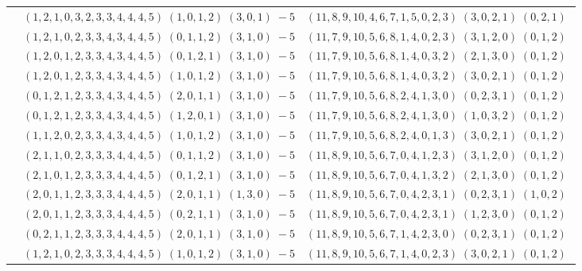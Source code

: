 \documentclass[11pt]{article}
\begin{document}
\begin{longtable}[l]{|c|c|c|}
 \cline{2-3} 
 & $(1 ,2 ,1 ,0 ,3 ,2 ,3 ,3 ,4 ,4 ,4 ,5) \;(1 ,0 ,1 ,2) \;(3 ,0 ,1) \;-5$ & $(11 ,8 ,9 ,10 ,4 ,6 ,7 ,1 ,5 ,0 ,2 ,3) \;(3 ,0 ,2 ,1) \;(0 ,2 ,1) \;$\\ 
 \cline{2-3} 
 & $(1 ,2 ,1 ,0 ,2 ,3 ,3 ,4 ,3 ,4 ,4 ,5) \;(0 ,1 ,1 ,2) \;(3 ,1 ,0) \;-5$ & $(11 ,7 ,9 ,10 ,5 ,6 ,8 ,1 ,4 ,0 ,2 ,3) \;(3 ,1 ,2 ,0) \;(0 ,1 ,2) \;$\\ 
 \cline{2-3} 
 & $(1 ,2 ,0 ,1 ,2 ,3 ,3 ,4 ,3 ,4 ,4 ,5) \;(0 ,1 ,2 ,1) \;(3 ,1 ,0) \;-5$ & $(11 ,7 ,9 ,10 ,5 ,6 ,8 ,1 ,4 ,0 ,3 ,2) \;(2 ,1 ,3 ,0) \;(0 ,1 ,2) \;$\\ 
 \cline{2-3} 
 & $(1 ,2 ,0 ,1 ,2 ,3 ,3 ,4 ,3 ,4 ,4 ,5) \;(1 ,0 ,1 ,2) \;(3 ,1 ,0) \;-5$ & $(11 ,7 ,9 ,10 ,5 ,6 ,8 ,1 ,4 ,0 ,3 ,2) \;(3 ,0 ,2 ,1) \;(0 ,1 ,2) \;$\\ 
 \cline{2-3} 
 & $(0 ,1 ,2 ,1 ,2 ,3 ,3 ,4 ,3 ,4 ,4 ,5) \;(2 ,0 ,1 ,1) \;(3 ,1 ,0) \;-5$ & $(11 ,7 ,9 ,10 ,5 ,6 ,8 ,2 ,4 ,1 ,3 ,0) \;(0 ,2 ,3 ,1) \;(0 ,1 ,2) \;$\\ 
 \cline{2-3} 
 & $(0 ,1 ,2 ,1 ,2 ,3 ,3 ,4 ,3 ,4 ,4 ,5) \;(1 ,2 ,0 ,1) \;(3 ,1 ,0) \;-5$ & $(11 ,7 ,9 ,10 ,5 ,6 ,8 ,2 ,4 ,1 ,3 ,0) \;(1 ,0 ,3 ,2) \;(0 ,1 ,2) \;$\\ 
 \cline{2-3} 
 & $(1 ,1 ,2 ,0 ,2 ,3 ,3 ,4 ,3 ,4 ,4 ,5) \;(1 ,0 ,1 ,2) \;(3 ,1 ,0) \;-5$ & $(11 ,7 ,9 ,10 ,5 ,6 ,8 ,2 ,4 ,0 ,1 ,3) \;(3 ,0 ,2 ,1) \;(0 ,1 ,2) \;$\\ 
 \cline{2-3} 
 & $(2 ,1 ,1 ,0 ,2 ,3 ,3 ,3 ,4 ,4 ,4 ,5) \;(0 ,1 ,1 ,2) \;(3 ,1 ,0) \;-5$ & $(11 ,8 ,9 ,10 ,5 ,6 ,7 ,0 ,4 ,1 ,2 ,3) \;(3 ,1 ,2 ,0) \;(0 ,1 ,2) \;$\\ 
 \cline{2-3} 
 & $(2 ,1 ,0 ,1 ,2 ,3 ,3 ,3 ,4 ,4 ,4 ,5) \;(0 ,1 ,2 ,1) \;(3 ,1 ,0) \;-5$ & $(11 ,8 ,9 ,10 ,5 ,6 ,7 ,0 ,4 ,1 ,3 ,2) \;(2 ,1 ,3 ,0) \;(0 ,1 ,2) \;$\\ 
 \cline{2-3} 
 & $(2 ,0 ,1 ,1 ,2 ,3 ,3 ,3 ,4 ,4 ,4 ,5) \;(2 ,0 ,1 ,1) \;(1 ,3 ,0) \;-5$ & $(11 ,8 ,9 ,10 ,5 ,6 ,7 ,0 ,4 ,2 ,3 ,1) \;(0 ,2 ,3 ,1) \;(1 ,0 ,2) \;$\\ 
 \cline{2-3} 
 & $(2 ,0 ,1 ,1 ,2 ,3 ,3 ,3 ,4 ,4 ,4 ,5) \;(0 ,2 ,1 ,1) \;(3 ,1 ,0) \;-5$ & $(11 ,8 ,9 ,10 ,5 ,6 ,7 ,0 ,4 ,2 ,3 ,1) \;(1 ,2 ,3 ,0) \;(0 ,1 ,2) \;$\\ 
 \cline{2-3} 
 & $(0 ,2 ,1 ,1 ,2 ,3 ,3 ,3 ,4 ,4 ,4 ,5) \;(2 ,0 ,1 ,1) \;(3 ,1 ,0) \;-5$ & $(11 ,8 ,9 ,10 ,5 ,6 ,7 ,1 ,4 ,2 ,3 ,0) \;(0 ,2 ,3 ,1) \;(0 ,1 ,2) \;$\\ 
 \cline{2-3} 
 & $(1 ,2 ,1 ,0 ,2 ,3 ,3 ,3 ,4 ,4 ,4 ,5) \;(1 ,0 ,1 ,2) \;(3 ,1 ,0) \;-5$ & $(11 ,8 ,9 ,10 ,5 ,6 ,7 ,1 ,4 ,0 ,2 ,3) \;(3 ,0 ,2 ,1) \;(0 ,1 ,2) \;$\\ 

\end{longtable}
\end{document}
